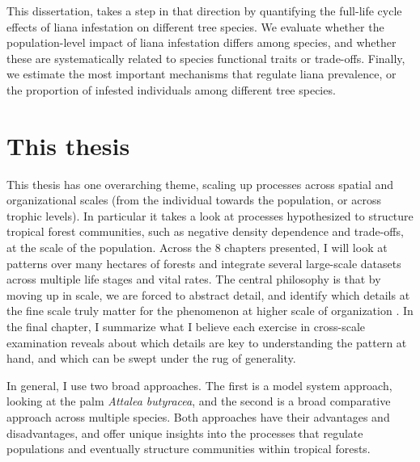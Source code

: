\documentclass[b5paper,justified]{tufte-book} %
\begin{document}
\begin{fullwidth}
This dissertation, takes a step in that direction by quantifying the full-life cycle effects of liana infestation on different tree species.  We evaluate whether the population-level impact of liana infestation differs among species, and whether these are systematically related to species functional traits or trade-offs. Finally, we estimate the most important mechanisms that regulate liana prevalence, or the proportion of infested individuals among different tree species.

\section{This thesis}
This thesis has one overarching theme, scaling up processes across spatial and organizational scales (from the individual towards the population, or across trophic levels).  In particular it takes a look at processes hypothesized to structure tropical forest communities, such as negative density dependence and trade-offs, at the scale of the population.  Across the 8 chapters presented, I will look at patterns over many hectares of forests and integrate several large-scale datasets across multiple life stages and vital rates. The central philosophy is that by moving up in scale, we are forced to abstract detail, and identify which details at the fine scale truly matter for the phenomenon at higher scale of organization \citep{Levin1992}. In the final chapter, I summarize what I believe each exercise in cross-scale examination reveals about which details are key to understanding the pattern at hand, and which can be swept under the rug of generality. 

In general, I use two broad approaches.  The first is a model system approach, looking at the palm \textit{Attalea butyracea}, and the second is a broad comparative approach across multiple species. Both approaches have their advantages and disadvantages, and offer unique insights into the processes that regulate populations and eventually structure communities within tropical forests.  


\end{fullwidth}
\end{document}
